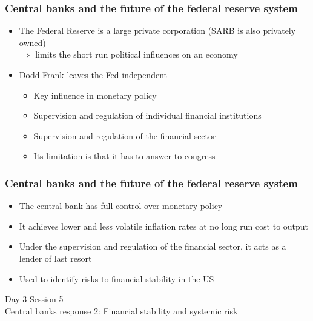 \documentclass[11pt]{beamer}
\begin{document}

\begin{frame}
\frametitle{Central banks and the future of the federal reserve system}
\begin{itemize}\itemsep10pt
\item The Federal Reserve is a large private corporation (SARB is also privately owned)\\
$\Rightarrow$ limits the short run political influences on an economy
\item Dodd-Frank leaves the Fed independent
\begin{itemize}\itemsep5pt
	\item Key influence in monetary policy
	\item Supervision and regulation of individual financial institutions
	\item Supervision and regulation of the financial sector
	\item Its limitation is that it has to answer to congress
\end{itemize}
\end{itemize}
\end{frame}


\begin{frame}
\frametitle{Central banks and the future of the federal reserve system}
\begin{itemize}\itemsep10pt
\item The central bank has full control over monetary policy
\item It achieves lower and less volatile inflation rates at no long run cost to output
\item Under the supervision and regulation of the financial sector, it acts as a lender of last resort
\item Used to identify risks to financial stability in the US
\end{itemize}
\end{frame}








\begin{frame}
\begin{center}
 Day 3 Session 5 \\
Central banks response 2: Financial stability and systemic risk
\end{center}
\end{frame}
\end{document}

